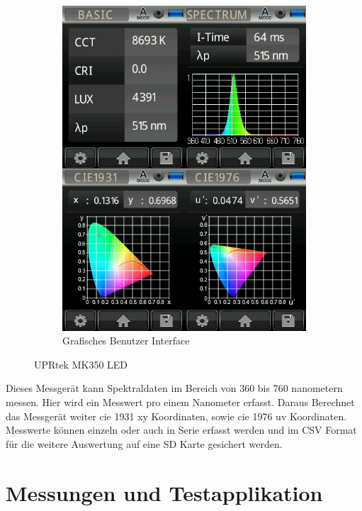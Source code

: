 \documentclass[11pt]{scrartcl}
\begin{document}
\begin{figure}[H]
\begin{subfigure}[b]{0.49\textwidth}
        \includegraphics[width=\textwidth]{images/mk350_lightcan_green.JPG}
        \caption{Grafisches Benutzer Interface}
    \end{subfigure}
    \caption{UPRtek MK350 LED}
\end{figure}
\noindent
Dieses Messgerät kann Spektraldaten im Bereich von 360 bis 760 nanometern messen. Hier wird ein Messwert pro einem Nanometer erfasst. Daraus Berechnet
das Messgerät weiter \ac{cie} 1931 xy Koordinaten, sowie \ac{cie} 1976 uv Koordinaten. Messwerte können einzeln oder auch in Serie erfasst werden und
im CSV Format für die weitere Auswertung auf eine SD Karte gesichert werden.
\clearpage

\section{Messungen und Testapplikation}
\end{document}
